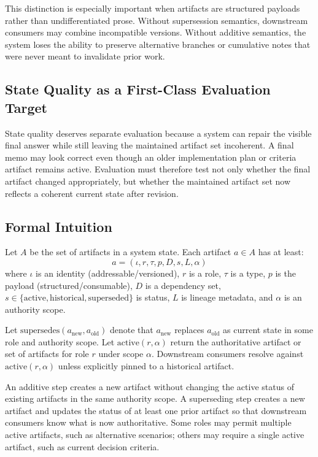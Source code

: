 \documentclass{article}
\begin{document}
This distinction is especially important when artifacts are structured payloads rather than undifferentiated prose. Without supersession semantics, downstream consumers may combine incompatible versions. Without additive semantics, the system loses the ability to preserve alternative branches or cumulative notes that were never meant to invalidate prior work.

\subsection{State Quality as a First-Class Evaluation Target}

State quality deserves separate evaluation because a system can repair the visible final answer while still leaving the maintained artifact set incoherent. A final memo may look correct even though an older implementation plan or criteria artifact remains active. Evaluation must therefore test not only whether the final artifact changed appropriately, but whether the maintained artifact set now reflects a coherent current state after revision.

\subsection{Formal Intuition}

Let $A$ be the set of artifacts in a system state. Each artifact $a \in A$ has at least:
\begin{equation}
a = (\iota, r, \tau, p, D, s, L, \alpha)
\end{equation}
where $\iota$ is an identity (addressable/versioned), $r$ is a role, $\tau$ is a type, $p$ is the payload (structured/consumable), $D$ is a dependency set, $s \in \{\mathrm{active},\mathrm{historical},\mathrm{superseded}\}$ is status, $L$ is lineage metadata, and $\alpha$ is an authority scope.

Let $\mathrm{supersedes}(a_{\mathrm{new}}, a_{\mathrm{old}})$ denote that $a_{\mathrm{new}}$ replaces $a_{\mathrm{old}}$ as current state in some role and authority scope. Let $\mathrm{active}(r,\alpha)$ return the authoritative artifact or set of artifacts for role $r$ under scope $\alpha$. Downstream consumers resolve against $\mathrm{active}(r,\alpha)$ unless explicitly pinned to a historical artifact.

An additive step creates a new artifact without changing the active status of existing artifacts in the same authority scope. A superseding step creates a new artifact and updates the status of at least one prior artifact so that downstream consumers know what is now authoritative. Some roles may permit multiple active artifacts, such as alternative scenarios; others may require a single active artifact, such as current decision criteria.
\end{document}
